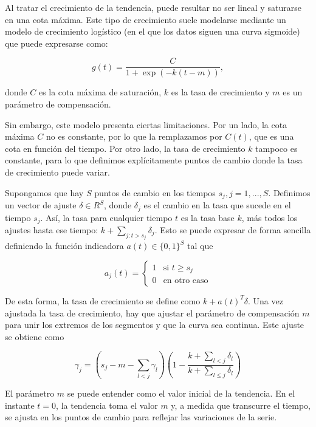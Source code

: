 \documentclass[12pt,twoside]{article}
\begin{document}
Al tratar el crecimiento de la tendencia, puede resultar no ser lineal y saturarse en una cota máxima. Este tipo de crecimiento suele modelarse mediante un modelo de crecimiento logístico (en el que los datos siguen una curva sigmoide) que puede expresarse como:

\begin{equation}
g(t) = \frac{C}{1 + \exp(-k (t - m))},
\end{equation}

donde $C$ es la cota máxima de saturación, $k$ es la tasa de crecimiento y $m$ es un parámetro de compensación.

Sin embargo, este modelo presenta ciertas limitaciones. Por un lado, la cota máxima $C$ no es constante, por lo que la remplazamos por $C(t)$, que es una cota en función del tiempo. Por otro lado, la tasa de crecimiento $k$ tampoco es constante, para lo que definimos explícitamente puntos de cambio donde la tasa de crecimiento puede variar. 

Supongamos que hay $S$ puntos de cambio en los tiempos $s_j, j = 1, ..., S$. Definimos un vector de ajuste $\delta \in R^S$, donde $\delta_j$ es el cambio en la tasa que sucede en el tiempo $s_j$. Así, la tasa para cualquier tiempo $t$ es la tasa base $k$, más todos los ajustes hasta ese tiempo: $k + \sum_{j:t > s_j} \delta_j$. Esto se puede expresar de forma sencilla definiendo la función indicadora $a(t) \in \{0,1\}^S$ tal que 

\begin{equation}
a_j(t) = 
\begin{cases}
1 & \text{si } t \geq s_j \\
0 & \text{en otro caso}
\end{cases}
\end{equation}

De esta forma, la tasa de crecimiento se define como $k + a(t)^T \delta$. Una vez ajustada la tasa de crecimiento, hay que ajustar el parámetro de compensación $m$ para unir los extremos de los segmentos y que la curva sea continua. Este ajuste se obtiene como 

\begin{equation}
\gamma_j = \left( s_j - m - \sum_{l<j} \gamma_l \right) 
\left( 1 - \frac{k + \sum_{l<j} \delta_l}{k + \sum_{l \leq j} \delta_l} \right)
\end{equation}

El parámetro $m$ se puede entender como el valor inicial de la tendencia. En el instante $t = 0$, la tendencia toma el valor $m$ y, a medida que transcurre el tiempo, se ajusta en los puntos 
de cambio para reflejar las variaciones de la serie.
\end{document}
